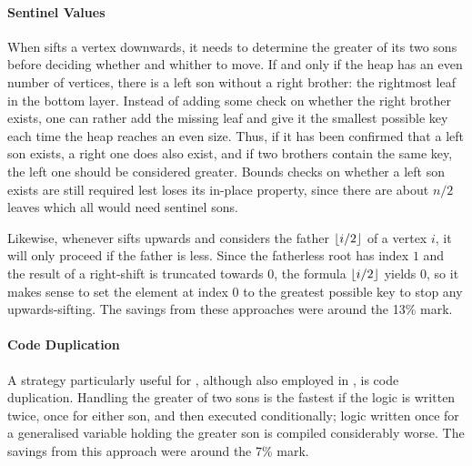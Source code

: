 \paragraph{Sentinel Values}
When \HS{} sifts a vertex downwards, it needs to determine the greater of its two sons before deciding whether and whither to move.
If and only if the heap has an even number of vertices, there is a left son without a right brother:
the rightmost leaf in the bottom layer.
Instead of adding some check on whether the right brother exists, one can rather add the missing leaf and give it the smallest possible key each time the heap reaches an even size.
Thus, if it has been confirmed that a left son exists, a right one does also exist, and if two brothers contain the same key, the left one should be considered greater.
Bounds checks on whether a left son exists are still required lest \HS{} loses its in-place property, since there are about \(n/2\) leaves which all would need sentinel sons.

Likewise, whenever \HS{} sifts upwards and considers the father \(\lfloor i/2\rfloor\) of a vertex \(i\), it will only proceed if the father is less.
Since the fatherless root has index \(1\) and the result of a right-shift is truncated towards \(0\), the formula \(\lfloor i/2\rfloor\) yields \(0\), so it makes sense to set the element at index \(0\) to the greatest possible key to stop any upwards-sifting.
The savings from these approaches were around the 13\% mark.

\paragraph{Code Duplication}
A strategy particularly useful for \HS{}, although also employed in \MS{}, is code duplication.
Handling the greater of two sons is the fastest if the logic is written twice, once for either son, and then executed conditionally;
logic written once for a generalised variable holding the greater son is compiled considerably worse.
The savings from this approach were around the 7\% mark.




